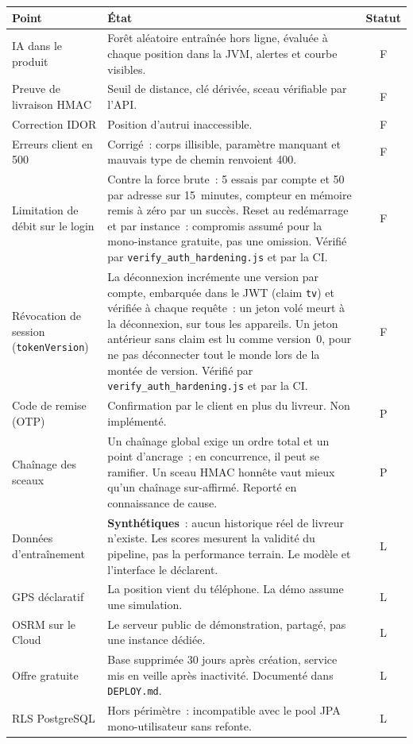 \documentclass[11pt,a4paper]{article}
\begin{document}
\begin{tabular}{|p{4.6cm}|p{10.2cm}|c|}
\hline
\textbf{Point} & \textbf{\'Etat} & \textbf{Statut} \\
\hline
IA dans le produit & For\^et al\'eatoire entra\^in\'ee hors ligne, \'evalu\'ee \`a chaque position dans la JVM, alertes et courbe visibles. & F \\
\hline
Preuve de livraison HMAC & Seuil de distance, cl\'e d\'eriv\'ee, sceau v\'erifiable par l'API. & F \\
\hline
Correction IDOR & Position d'autrui inaccessible. & F \\
\hline
Erreurs client en 500 & Corrig\'e~: corps illisible, param\`etre manquant et mauvais type de chemin renvoient 400. & F \\
\hline
Limitation de d\'ebit sur le login & Contre la force brute~: 5 essais par compte et 50 par adresse sur 15~minutes, compteur en m\'emoire remis \`a z\'ero par un succ\`es. Reset au red\'emarrage et par instance~: compromis assum\'e pour la mono-instance gratuite, pas une omission. V\'erifi\'e par \texttt{verify\_auth\_hardening.js} et par la CI. & F \\
\hline
R\'evocation de session (\texttt{tokenVersion}) & La d\'econnexion incr\'emente une version par compte, embarqu\'ee dans le JWT (claim \texttt{tv}) et v\'erifi\'ee \`a chaque requ\^ete~: un jeton vol\'e meurt \`a la d\'econnexion, sur tous les appareils. Un jeton ant\'erieur sans claim est lu comme version~0, pour ne pas d\'econnecter tout le monde lors de la mont\'ee de version. V\'erifi\'e par \texttt{verify\_auth\_hardening.js} et par la CI. & F \\
\hline
Code de remise (OTP) & Confirmation par le client en plus du livreur. Non impl\'ement\'e. & P \\
\hline
Cha\^inage des sceaux & Un cha\^inage global exige un ordre total et un point d'ancrage~; en concurrence, il peut se ramifier. Un sceau HMAC honn\^ete vaut mieux qu'un cha\^inage sur-affirm\'e. Report\'e en connaissance de cause. & P \\
\hline
Donn\'ees d'entra\^inement & \textbf{Synth\'etiques}~: aucun historique r\'eel de livreur n'existe. Les scores mesurent la validit\'e du pipeline, pas la performance terrain. Le mod\`ele et l'interface le d\'eclarent. & L \\
\hline
GPS d\'eclaratif & La position vient du t\'el\'ephone. La d\'emo assume une simulation. & L \\
\hline
OSRM sur le Cloud & Le serveur public de d\'emonstration, partag\'e, pas une instance d\'edi\'ee. & L \\
\hline
Offre gratuite & Base supprim\'ee 30 jours apr\`es cr\'eation, service mis en veille apr\`es inactivit\'e. Document\'e dans \texttt{DEPLOY.md}. & L \\
\hline
RLS PostgreSQL & Hors p\'erim\`etre~: incompatible avec le pool JPA mono-utilisateur sans refonte. & L \\
\hline
\end{tabular}
\end{document}
